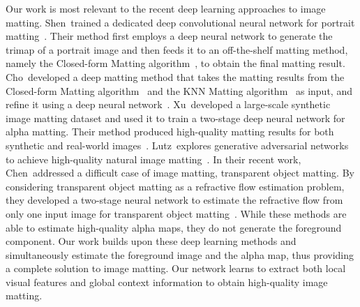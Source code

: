 \documentclass[10pt,twocolumn,letterpaper]{article}
\begin{document}
Our work is most relevant to the recent deep learning approaches to image matting. Shen~\etal  trained a dedicated deep convolutional neural network for portrait matting~\cite{shen2016deep}. Their method first employs a deep neural network to generate the trimap of a portrait image and then feeds it to an off-the-shelf matting method, namely the Closed-form Matting algorithm~\cite{levin2008closed}, to obtain the final matting result. Cho~\etal developed a deep matting method that takes the matting results from the Closed-form Matting algorithm~\cite{levin2008closed} and the KNN Matting algorithm~\cite{chen2013knn} as input, and refine it using a deep neural network~\cite{cho2016natural, cho2019deep}. Xu~\etal developed a large-scale synthetic image matting dataset and used it to train a two-stage deep neural network for alpha matting. Their method produced high-quality matting results for both synthetic and real-world images~\cite{xu2017deep}. Lutz~\etal explores generative adversarial networks to achieve high-quality natural image matting~\cite{lutz2018alphagan}.   In their recent work, Chen~\etal addressed a difficult case of image matting, transparent object matting. By considering transparent object matting as a refractive flow estimation problem, they developed a two-stage neural network to estimate the refractive flow from only one input image for transparent object matting~\cite{chen2018tom}. While these methods are able to estimate high-quality alpha maps, they do not generate the foreground component. Our work builds upon these deep learning methods and simultaneously estimate the foreground image and the alpha map, thus providing a complete solution to image matting. Our network learns to extract both local visual features and global context information to obtain high-quality image matting.
\end{document}
